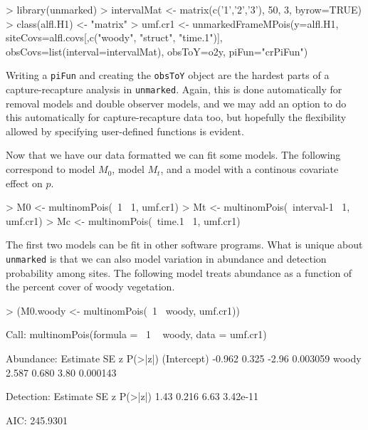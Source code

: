 \documentclass[a4paper]{article}
\renewenvironment{Schunk}{\vspace{\topsep}}{\vspace{\topsep}}
\begin{document}
\begin{Schunk}
\begin{Sinput}
> library(unmarked)
> intervalMat <- matrix(c('1','2','3'), 50, 3, byrow=TRUE)
> class(alfl.H1) <- "matrix"
> umf.cr1 <- unmarkedFrameMPois(y=alfl.H1,
     siteCovs=alfl.covs[,c("woody", "struct", "time.1")],
     obsCovs=list(interval=intervalMat),
     obsToY=o2y, piFun="crPiFun")
\end{Sinput}
\end{Schunk}


Writing a \texttt{piFun} and creating the \texttt{obsToY} object are
the hardest parts of a capture-recapture analysis in
\texttt{unmarked}. Again, this is done automatically for removal models
and double observer models, and we may add an option to do this
automatically for capture-recapture data too, but hopefully
the flexibility allowed by specifying user-defined
functions is evident.

Now that we have our data formatted we can fit some models. The
following correspond to model $M_0$, model $M_t$, and a model with a
continous covariate effect on $p$.


\begin{Schunk}
\begin{Sinput}
> M0 <- multinomPois(~1 ~1, umf.cr1)
> Mt <- multinomPois(~interval-1 ~1, umf.cr1)
> Mc <- multinomPois(~time.1 ~1, umf.cr1)
\end{Sinput}
\end{Schunk}

The first two models can be fit in other software programs. What is
unique about \texttt{unmarked} is that we can also model variation in
abundance and detection probability among sites. The following model
treats abundance as
a function of the percent cover of woody vegetation.

\begin{Schunk}
\begin{Sinput}
> (M0.woody <- multinomPois(~1 ~woody, umf.cr1))
\end{Sinput}
\begin{Soutput}
Call:
multinomPois(formula = ~1 ~ woody, data = umf.cr1)

Abundance:
            Estimate    SE     z  P(>|z|)
(Intercept)   -0.962 0.325 -2.96 0.003059
woody          2.587 0.680  3.80 0.000143

Detection:
 Estimate    SE    z  P(>|z|)
     1.43 0.216 6.63 3.42e-11

AIC: 245.9301 
\end{Soutput}
\end{Schunk}
\end{document}
